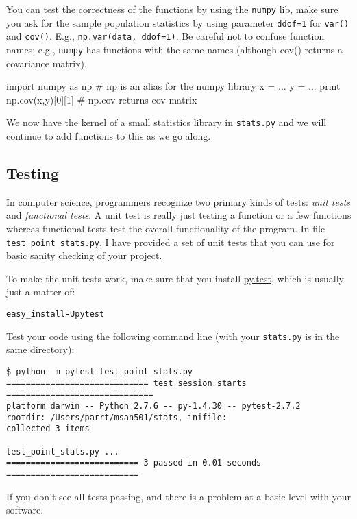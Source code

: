 \begin{fullwidth}
You can test the correctness of the functions by using the {\tt numpy} lib, make sure you ask for the sample population statistics by using parameter {\tt ddof=1} for {\tt var()} and {\tt cov()}. E.g., {\tt np.var(data, ddof=1)}. Be careful not to confuse function names; e.g., {\tt numpy} has functions with the same names (although cov() returns a covariance matrix).

\begin{pyverbatim}
import numpy as np  # np is an alias for the numpy library
x = ...
y = ...
print np.cov(x,y)[0][1] # np.cov returns cov matrix
\end{pyverbatim}

We now have the kernel of a small statistics library in {\tt stats.py} and we will continue to add functions to this as we go along. 

\subsection{Testing}

In computer science, programmers recognize two primary kinds of tests: {\em unit tests} and {\em functional tests}. A unit test is really just testing a function or a few functions whereas functional tests test the overall functionality of the program. In file {\tt test\_point\_stats.py}, I have provided a set of unit tests that you can use for basic sanity checking of your project. 

To make the unit tests work, make sure that you install \href{http://pytest.org/latest/getting-started.html}{py.test}, which is usually just a matter of:

\begin{alltt}
easy_install -U pytest
\end{alltt}

Test your code using the following command line (with your {\tt stats.py} is in the same directory):

\begin{lstlisting}[style=BashInputStyle]
$ python -m pytest test_point_stats.py
============================= test session starts ==============================
platform darwin -- Python 2.7.6 -- py-1.4.30 -- pytest-2.7.2
rootdir: /Users/parrt/msan501/stats, inifile: 
collected 3 items 

test_point_stats.py ...
=========================== 3 passed in 0.01 seconds ===========================
\end{lstlisting}

\noindent If you don't see all tests passing, and there is a problem at a basic level with your software.


\end{fullwidth}
